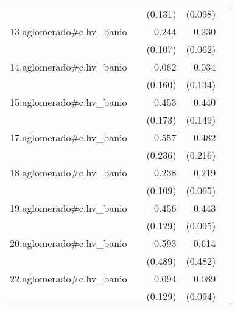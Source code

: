 {\begin{longtable}{l*{4}{D{.}{.}{-1}}}
            &                     &     (0.131)         &     (0.098)         &                     \\
\addlinespace
13.aglomerado#c.hv\_banio&                     &       0.244\sym{*}  &       0.230\sym{***}&                     \\
            &                     &     (0.107)         &     (0.062)         &                     \\
\addlinespace
14.aglomerado#c.hv\_banio&                     &       0.062         &       0.034         &                     \\
            &                     &     (0.160)         &     (0.134)         &                     \\
\addlinespace
15.aglomerado#c.hv\_banio&                     &       0.453\sym{**} &       0.440\sym{**} &                     \\
            &                     &     (0.173)         &     (0.149)         &                     \\
\addlinespace
17.aglomerado#c.hv\_banio&                     &       0.557\sym{*}  &       0.482\sym{*}  &                     \\
            &                     &     (0.236)         &     (0.216)         &                     \\
\addlinespace
18.aglomerado#c.hv\_banio&                     &       0.238\sym{*}  &       0.219\sym{***}&                     \\
            &                     &     (0.109)         &     (0.065)         &                     \\
\addlinespace
19.aglomerado#c.hv\_banio&                     &       0.456\sym{***}&       0.443\sym{***}&                     \\
            &                     &     (0.129)         &     (0.095)         &                     \\
\addlinespace
20.aglomerado#c.hv\_banio&                     &      -0.593         &      -0.614         &                     \\
            &                     &     (0.489)         &     (0.482)         &                     \\
\addlinespace
22.aglomerado#c.hv\_banio&                     &       0.094         &       0.089         &                     \\
            &                     &     (0.129)         &     (0.094)         &                     \\

\end{longtable}}
